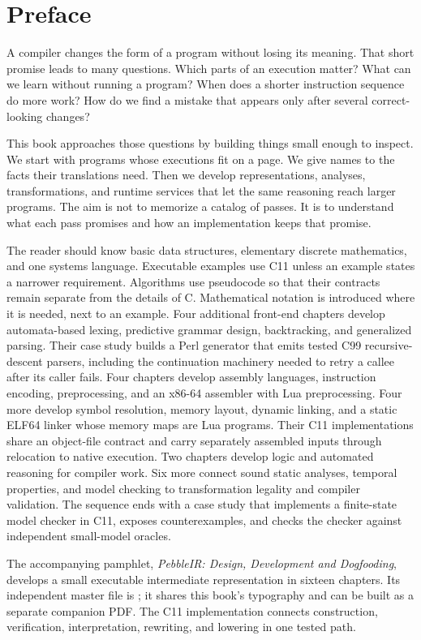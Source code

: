 \chapter*{Preface}

A compiler changes the form of a program without losing its meaning.
That short promise leads to many questions.
Which parts of an execution matter?
What can we learn without running a program?
When does a shorter instruction sequence do more work?
How do we find a mistake that appears only after several correct-looking changes?

This book approaches those questions by building things small enough to inspect.
We start with programs whose executions fit on a page.
We give names to the facts their translations need.
Then we develop representations, analyses, transformations, and runtime services that let the same reasoning reach larger programs.
The aim is not to memorize a catalog of passes.
It is to understand what each pass promises and how an implementation keeps that promise.

The reader should know basic data structures, elementary discrete mathematics, and one systems language.
Executable examples use C11 unless an example states a narrower requirement.
Algorithms use pseudocode so that their contracts remain separate from the details of C.
Mathematical notation is introduced where it is needed, next to an example.
Four additional front-end chapters develop automata-based lexing, predictive grammar design, backtracking, and generalized parsing.
Their case study builds a Perl generator that emits tested C99 recursive-descent parsers, including the continuation machinery needed to retry a callee after its caller fails.
Four chapters develop assembly languages, instruction encoding, preprocessing, and an x86-64 assembler with Lua preprocessing.
Four more develop symbol resolution, memory layout, dynamic linking, and a static ELF64 linker whose memory maps are Lua programs.
Their C11 implementations share an object-file contract and carry separately assembled inputs through relocation to native execution.
Two chapters develop logic and automated reasoning for compiler work.
Six more connect sound static analyses, temporal properties, and model checking to transformation legality and compiler validation.
The sequence ends with a case study that implements a finite-state model checker in C11, exposes counterexamples, and checks the checker against independent small-model oracles.

The accompanying pamphlet, \emph{PebbleIR: Design, Development and Dogfooding}, develops a small executable intermediate representation in sixteen chapters.
Its independent master file is ; it shares this book's typography and can be built as a separate companion PDF.
The C11 implementation connects construction, verification, interpretation, rewriting, and lowering in one tested path.

